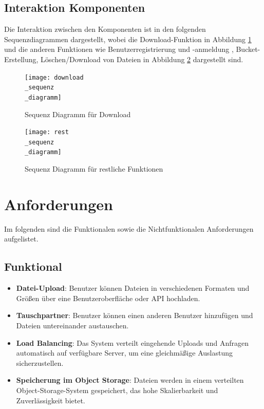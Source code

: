 \documentclass[12pt]{report}
\begin{document}
		\subsection{Interaktion Komponenten}
			Die Interaktion zwischen den Komponenten ist in den folgenden Sequenzdiagrammen dargestellt, wobei die Download-Funktion in Abbildung \ref{fig:download_sequenz_diagramm} und die anderen Funktionen wie Benutzerregistrierung und -anmeldung , Bucket-Erstellung, Löschen/Download von Dateien in Abbildung \ref{fig:rest_sequenz_diagramm} dargestellt sind.
			
			\begin{figure}[h]
				\centering
				\texttt{[image: download\\\_sequenz\\\_diagramm]}
				\caption{Sequenz Diagramm für Download}
				\label{fig:download_sequenz_diagramm}
			\end{figure}
			
			\begin{figure}[h]
				\centering
				\texttt{[image: rest\\\_sequenz\\\_diagramm]}
				\caption{Sequenz Diagramm für restliche Funktionen}
				\label{fig:rest_sequenz_diagramm}
			\end{figure}
		
	\section{Anforderungen}
		Im folgenden sind die Funktionalen sowie die Nichtfunktionalen Anforderungen aufgelistet.
		\subsection{Funktional}
			\begin{itemize}
				\item \textbf{Datei-Upload}: Benutzer können Dateien in verschiedenen Formaten und Größen über eine Benutzeroberfläche oder API hochladen.
				\item \textbf{Tauschpartner}: Benutzer können einen anderen Benutzer hinzufügen und Dateien untereinander austauschen.
				\item \textbf{Load Balancing}: Das System verteilt eingehende Uploads und Anfragen automatisch auf verfügbare Server, um eine gleichmäßige Auslastung sicherzustellen.
				\item \textbf{Speicherung im Object Storage}: Dateien werden in einem verteilten Object-Storage-System gespeichert, das hohe Skalierbarkeit und Zuverlässigkeit bietet.
			\end{itemize}
\end{document}
